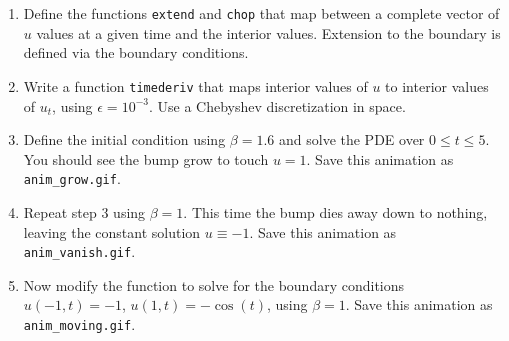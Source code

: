 \documentclass[11pt,twoside]{fncextra}
\begin{document}
\begin{enumerate}
\item Define the functions \texttt{extend} and \texttt{chop} that map between a complete vector of $u$ values at a given time and the interior values. Extension to the boundary is defined via the boundary conditions. 
\item Write a function \texttt{timederiv} that maps interior values of $u$ to interior values of $u_t$, using $\epsilon=10^{-3}$. Use a Chebyshev discretization in space.
\item Define the initial condition using $\beta = 1.6$ and solve the PDE over $0\le t \le 5$. You should see the bump grow to touch $u=1$. Save this animation as \verb!anim_grow.gif!. 
\item Repeat step 3 using $\beta = 1$. This time the bump dies away down to nothing, leaving the constant solution $u\equiv -1$. Save this animation as \verb!anim_vanish.gif!.
\item Now modify the function to solve for the boundary conditions $u(-1,t)=-1$, $u(1,t)=-\cos(t)$, using $\beta=1$. Save this animation as \verb!anim_moving.gif!.
\end{enumerate}
  
    
\end{document}
